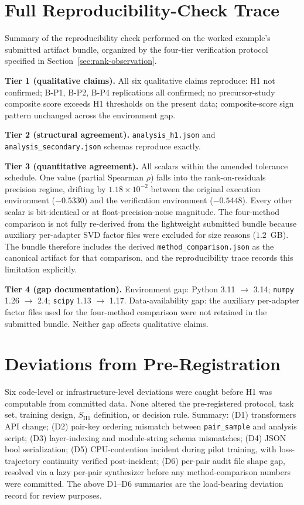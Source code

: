 \documentclass[10pt]{article}
\begin{document}
\section{Full Reproducibility-Check Trace}
\label{app:reproducibility}

Summary of the reproducibility check performed on the worked
example's submitted artifact bundle, organized by the four-tier
verification protocol specified in
Section~\ref{sec:rank-observation}.

\textbf{Tier 1 (qualitative claims).} All six qualitative claims
reproduce: H1 not confirmed; B-P1, B-P2, B-P4 replications all
confirmed; no precursor-study composite score exceeds H1 thresholds
on the present data; composite-score sign pattern unchanged across
the environment gap.

\textbf{Tier 2 (structural agreement).} \texttt{analysis\_h1.json}
and \texttt{analysis\_secondary.json} schemas reproduce exactly.

\textbf{Tier 3 (quantitative agreement).} All scalars within the
amended tolerance schedule. One value (partial Spearman $\rho$)
falls into the rank-on-residuals precision regime, drifting by
$1.18 \times 10^{-2}$ between the original execution environment
($-0.5330$) and the verification environment ($-0.5448$). Every
other scalar is bit-identical or at float-precision-noise
magnitude. The four-method comparison is not fully re-derived from the
lightweight submitted bundle because auxiliary per-adapter SVD
factor files were excluded for size reasons ($1.2$~GB). The
bundle therefore includes the derived
\texttt{method\_comparison.json} as the canonical artifact for
that comparison, and the reproducibility trace records this
limitation explicitly.

\textbf{Tier 4 (gap documentation).} Environment gap: Python 3.11
$\rightarrow$ 3.14; \texttt{numpy} 1.26 $\rightarrow$ 2.4;
\texttt{scipy} 1.13 $\rightarrow$ 1.17. Data-availability gap: the
auxiliary per-adapter factor files used for the four-method
comparison were not retained in the submitted bundle. Neither gap
affects qualitative claims.

\section{Deviations from Pre-Registration}
\label{app:deviations}

Six code-level or infrastructure-level deviations were caught before
H1 was computable from committed data. None altered the
pre-registered protocol, task set, training design, $S_{\mathrm{H1}}$
definition, or decision rule. Summary: (D1) transformers API
change; (D2) pair-key ordering mismatch between \texttt{pair\_sample}
and analysis script; (D3) layer-indexing and module-string schema
mismatches; (D4) JSON bool serialization; (D5) CPU-contention
incident during pilot training, with loss-trajectory continuity
verified post-incident; (D6) per-pair audit file
shape gap, resolved via a lazy per-pair synthesizer before any
method-comparison numbers were committed. The above D1--D6
summaries are the load-bearing deviation record for review
purposes.
\end{document}
